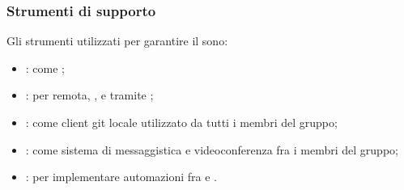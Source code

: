     \subsubsection{Strumenti di supporto}
    Gli strumenti utilizzati per garantire il  sono:
    \begin{itemize}
        \item \textbf{}: come ;
        \item \textbf{}: per  remota, ,  e  tramite ;
        \item \textbf{}: come client git locale utilizzato da tutti i membri del gruppo;
        \item \textbf{}: come sistema di messaggistica e videoconferenza fra i membri del gruppo;
        \item \textbf{}: per implementare automazioni fra  e .
    \end{itemize}

